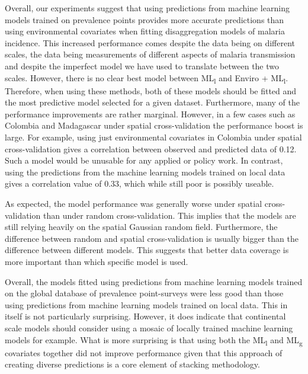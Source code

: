 \documentclass[review]{elsarticle}
\begin{document}
Overall, our experiments suggest that using predictions from machine learning models trained on prevalence points provides more accurate predictions than using environmental covariates when fitting disaggregation models of malaria incidence.
This increased performance comes despite the data being on different scales, the data being measurements of different aspects of malaria transmission and despite the imperfect model we have used to translate between the two scales.
However, there is no clear best model between ML\textsubscript{l} and Enviro + ML\textsubscript{l}.
Therefore, when using these methods, both of these models should be fitted and the most predictive model selected for a given dataset.
Furthermore, many of the performance improvements are rather marginal. 
However, in a few cases such as Colombia and Madagascar under spatial cross-validation the performance boost is large.
For example, using just environmental covariates in Colombia under spatial cross-validation gives a correlation between observed and predicted data of 0.12.
Such a model would be unusable for any applied or policy work.
In contrast, using the predictions from the machine learning models trained on local data gives a correlation value of 0.33, which while still poor is possibly useable.

As expected, the model performance was generally worse under spatial cross-validation than under random cross-validation.
This implies that the models are still relying heavily on the spatial Gaussian random field.
Furthermore, the difference between random and spatial cross-validation is usually bigger than the difference between different models.
This suggests that better data coverage is more important than which specific model is used.






Overall, the models fitted using predictions from machine learning models trained on the global database of prevalence point-surveys were less good than those using predictions from machine learning models trained on local data.
This in itself is not particularly surprising.
However, it does indicate that continental scale models should consider using a mosaic of locally trained machine learning models for example.
What is more surprising is that using both the ML\textsubscript{l} and ML\textsubscript{g} covariates together did not improve performance given that this approach of creating diverse predictions is a core element of stacking methodology.
\end{document}
